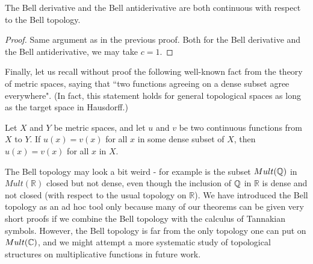 \begin{theorem} \label{BellDerivativeContinuity}
The Bell derivative and the Bell antiderivative are both continuous with respect to the Bell topology.
\end{theorem}
\begin{proof}
Same argument as in the previous proof. Both for the Bell derivative and the Bell antiderivative, we may take $c=1$. 
\end{proof}

Finally, let us recall without proof the following well-known fact from the theory of metric spaces, saying that ``two functions agreeing on a dense subset agree everywhere". (In fact, this statement holds for general topological spaces as long as the target space in Hausdorff.)

\begin{proposition}
Let $X$ and $Y$ be metric spaces, and let $u$ and $v$ be two continuous functions from $X$ to $Y$. If $u(x) = v(x)$ for all $x$ in some dense subset of $X$, then $u(x) = v(x)$ for all $x$ in $X$.  
\end{proposition}

\begin{remark}
The Bell topology may look a bit weird - for example is the subset $Mult(\mathbb{Q})$ in $Mult(\mathbb{R})$ closed but not dense, even though the inclusion of $\mathbb{Q}$ in $\mathbb{R}$ is dense and not closed (with respect to the usual topology on $\mathbb{R}$). We have introduced the Bell topology as an ad hoc tool only because many of our theorems can be given very short proofs if we combine the Bell topology with the calculus of Tannakian symbols. However, the Bell topology is far from the only topology one can put on $Mult(\mathbb{C})$, and we might attempt a more systematic study of topological structures on multiplicative functions in future work. 
\end{remark}








